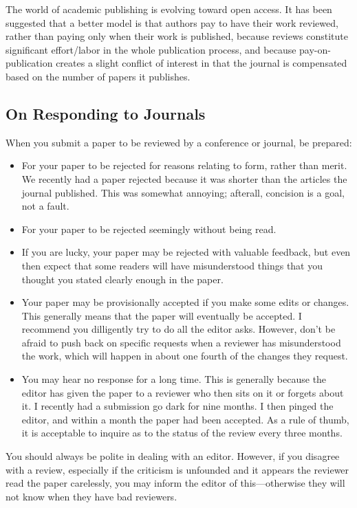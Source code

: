 \documentclass[
	fontsize=10pt, %
	twoside=false, %
	secnumdepth=1, %
]{kaobook}
\begin{document}
The world of academic publishing is evolving toward open access. It has been suggested that a better
model is that authors pay to have their work reviewed, rather than paying only when their work is published,
because reviews constitute significant effort/labor in the whole publication process, and because
pay-on-publication creates a slight conflict of interest in that the journal is compensated based on
the number of papers it publishes.

\subsection{On Responding to Journals}

When you submit a paper to be reviewed by a conference or journal, be prepared:
\begin{itemize}
\item For your paper to be rejected for reasons relating to form, rather than merit.
  We recently had a paper rejected because it was shorter than the articles the journal published. This was somewhat annoying; afterall, concision
  is a goal, not a fault.
\item For your paper to be rejected seemingly without being read.
\item If you are lucky, your paper may be rejected with valuable feedback, but even then expect that some readers will have misunderstood things that you
  thought you stated clearly enough in the paper.
\item Your paper may be provisionally accepted if you make some edits or changes. This generally means that the paper will eventually be accepted.
  I recommend you dilligently try to do all the editor asks. However, don't be afraid to push back on specific requests when a reviewer has
  misunderstood the work, which will happen in about one fourth of the changes they request.
\item You may hear no response for a long time. This is generally because the editor has given the paper to a reviewer
  who then sits on it or forgets about it. I recently had a submission go dark for nine months.
  I then pinged the editor, and within a month the paper had been accepted. As a rule of thumb, it
  is acceptable to inquire as to the status of the review every three months.
\end{itemize}
You should always be polite in dealing with an editor. However, if you disagree with a review, especially if the criticism is unfounded
and it appears the reviewer read the paper carelessly, you may inform the editor of this---otherwise they will not know when they have bad reviewers.
\end{document}
